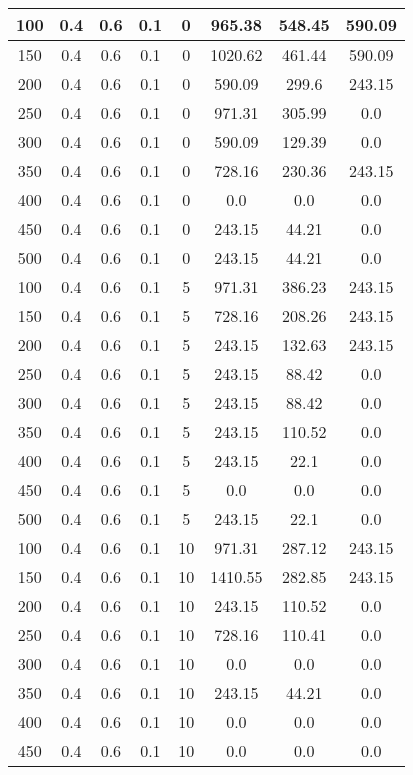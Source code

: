 \documentclass[a4paper, 12pt]{extreport}
\begin{document}
\begin{itemize}
\begin{longtable}{|c|c|c|c|c|c|c|c|}
			100 & 0.4 & 0.6 & 0.1 & 0 & 965.38 & 548.45 & 590.09 \\\hline
			150 & 0.4 & 0.6 & 0.1 & 0 & 1020.62 & 461.44 & 590.09 \\\hline
			200 & 0.4 & 0.6 & 0.1 & 0 & 590.09 & 299.6 & 243.15 \\\hline
			250 & 0.4 & 0.6 & 0.1 & 0 & 971.31 & 305.99 & 0.0 \\\hline
			300 & 0.4 & 0.6 & 0.1 & 0 & 590.09 & 129.39 & 0.0 \\\hline
			350 & 0.4 & 0.6 & 0.1 & 0 & 728.16 & 230.36 & 243.15 \\\hline
			400 & 0.4 & 0.6 & 0.1 & 0 & 0.0 & 0.0 & 0.0 \\\hline
			450 & 0.4 & 0.6 & 0.1 & 0 & 243.15 & 44.21 & 0.0 \\\hline
			500 & 0.4 & 0.6 & 0.1 & 0 & 243.15 & 44.21 & 0.0 \\\hline
			100 & 0.4 & 0.6 & 0.1 & 5 & 971.31 & 386.23 & 243.15 \\\hline
			150 & 0.4 & 0.6 & 0.1 & 5 & 728.16 & 208.26 & 243.15 \\\hline
			200 & 0.4 & 0.6 & 0.1 & 5 & 243.15 & 132.63 & 243.15 \\\hline
			250 & 0.4 & 0.6 & 0.1 & 5 & 243.15 & 88.42 & 0.0 \\\hline
			300 & 0.4 & 0.6 & 0.1 & 5 & 243.15 & 88.42 & 0.0 \\\hline
			350 & 0.4 & 0.6 & 0.1 & 5 & 243.15 & 110.52 & 0.0 \\\hline
			400 & 0.4 & 0.6 & 0.1 & 5 & 243.15 & 22.1 & 0.0 \\\hline
			450 & 0.4 & 0.6 & 0.1 & 5 & 0.0 & 0.0 & 0.0 \\\hline
			500 & 0.4 & 0.6 & 0.1 & 5 & 243.15 & 22.1 & 0.0 \\\hline
			100 & 0.4 & 0.6 & 0.1 & 10 & 971.31 & 287.12 & 243.15 \\\hline
			150 & 0.4 & 0.6 & 0.1 & 10 & 1410.55 & 282.85 & 243.15 \\\hline
			200 & 0.4 & 0.6 & 0.1 & 10 & 243.15 & 110.52 & 0.0 \\\hline
			250 & 0.4 & 0.6 & 0.1 & 10 & 728.16 & 110.41 & 0.0 \\\hline
			300 & 0.4 & 0.6 & 0.1 & 10 & 0.0 & 0.0 & 0.0 \\\hline
			350 & 0.4 & 0.6 & 0.1 & 10 & 243.15 & 44.21 & 0.0 \\\hline
			400 & 0.4 & 0.6 & 0.1 & 10 & 0.0 & 0.0 & 0.0 \\\hline
			450 & 0.4 & 0.6 & 0.1 & 10 & 0.0 & 0.0 & 0.0 \\\hline

\end{longtable}
\end{itemize}
\end{document}
